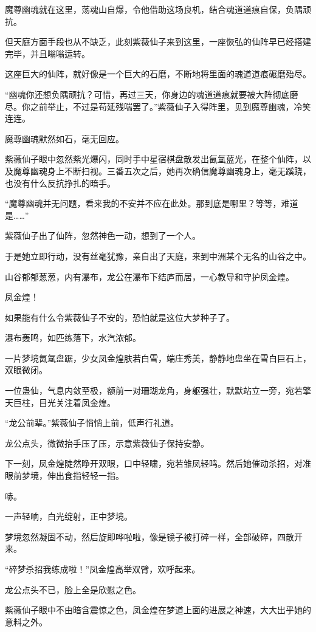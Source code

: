 \begin{this_body}
魔尊幽魂就在这里，荡魂山自爆，令他借助这场良机，结合魂道道痕自保，负隅顽抗。

但天庭方面手段也从不缺乏，此刻紫薇仙子来到这里，一座恢弘的仙阵早已经搭建完毕，并且嗡嗡运转。

这座巨大的仙阵，就好像是一个巨大的石磨，不断地将里面的魂道道痕碾磨殆尽。

“幽魂你还想负隅顽抗？可惜，再过三天，你身边的魂道道痕就要被大阵彻底磨尽。你之前举止，不过是苟延残喘罢了。”紫薇仙子入得阵里，见到魔尊幽魂，冷笑连连。

魔尊幽魂默然如石，毫无回应。

紫薇仙子眼中忽然紫光爆闪，同时手中星宿棋盘散发出氤氲蓝光，在整个仙阵，以及魔尊幽魂身上不断扫视。三番五次之后，她再次确信魔尊幽魂身上，毫无蹊跷，也没有什么反抗挣扎的暗手。

“魔尊幽魂并无问题，看来我的不安并不应在此处。那到底是哪里？等等，难道是……”

紫薇仙子出了仙阵，忽然神色一动，想到了一个人。

于是她立即行动，没有丝毫犹豫，亲自出了天庭，来到中洲某个无名的山谷之中。

山谷郁郁葱葱，内有瀑布，龙公在瀑布下结庐而居，一心教导和守护凤金煌。

凤金煌！

如果能有什么令紫薇仙子不安的，恐怕就是这位大梦种子了。

瀑布轰鸣，如匹练落下，水汽浓郁。

一片梦境氤氲盘踞，少女凤金煌肤若白雪，端庄秀美，静静地盘坐在雪白巨石上，双眼微闭。

一位蛊仙，气息内敛至极，额前一对珊瑚龙角，身躯强壮，默默站立一旁，宛若擎天巨柱，目光关注着凤金煌。

“龙公前辈。”紫薇仙子悄悄上前，低声行礼道。

龙公点头，微微抬手压了压，示意紫薇仙子保持安静。

下一刻，凤金煌陡然睁开双眼，口中轻啸，宛若雏凤轻鸣。然后她催动杀招，对准眼前梦境，伸出食指轻轻一指。

哧。

一声轻响，白光绽射，正中梦境。

梦境忽然凝固不动，然后旋即哗啦啦，像是镜子被打碎一样，全部破碎，四散开来。

“碎梦杀招我练成啦！”凤金煌高举双臂，欢呼起来。

龙公点头不已，脸上全是欣慰之色。

紫薇仙子眼中不由暗含震惊之色，凤金煌在梦道上面的进展之神速，大大出乎她的意料之外。


\end{this_body}
